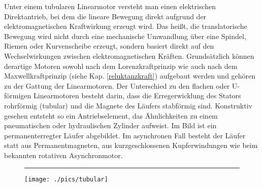 \begin{description}[leftmargin=2.5cm]
					\item[Tubulare Linearmotoren] 
					Unter einem tubularen Linearmotor versteht man einen elektrischen Direktantrieb, bei dem die lineare Bewegung direkt aufgrund der elektromagnetischen Kraftwirkung erzeugt wird. Das heißt, die translatorische Bewegung wird nicht durch eine mechanische Umwandlung über eine Spindel, Riemen oder Kurvenscheibe erzeugt, sondern basiert direkt auf den Wechselwirkungen zwischen elektromagnetischen Kräften. Grundsätzlich können derartige Motoren sowohl nach dem Lorenzkraftprinzip wie auch nach dem Maxwellkraftprinzip (siehe Kap. \ref{reluktanzkraft}) aufgebaut werden und gehören zu der Gattung der Linearmotoren. Der Unterschied zu den flachen oder U-förmigen Linearmotoren besteht darin, dass die Erregerwicklung des Stators rohrförmig (tubular) und die Magnete des Läufers stabförmig sind. Konstruktiv gesehen entsteht so ein Antriebselement, das Ähnlichkeiten zu einem pneumatischen oder hydraulischen Zylinder aufweist. Im Bild ist ein permanenterregter Läufer abgebildet. Im asynchronen Fall besteht der Läufer statt aus Permanentmagneten, aus kurzgeschlossenen Kupferwindungen wie beim bekannten rotativen Asynchronmotor.
					\begin{figure}[!h]
						\centering \rule{1.5cm}{0cm}
						\texttt{[image: ./pics/tubular]}
					\end{figure}
					

\end{description}
